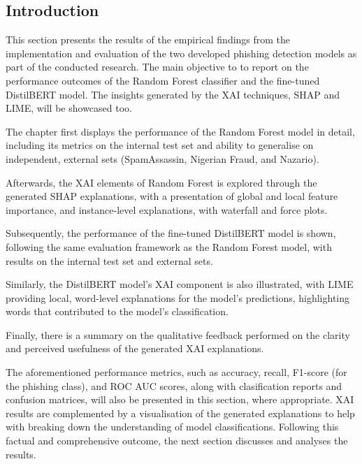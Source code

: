 
\subsection{Introduction}
This section presents the results of the empirical findings from the implementation and evaluation of the two developed phishing detection models as part of the conducted research. The main objective to to report on the performance outcomes of the Random Forest classifier and the fine-tuned DistilBERT model. The insights generated by the XAI techniques, SHAP and LIME, will be showcased too.\newline

\noindent The chapter first displays the performance of the Random Forest model in detail, including its metrics on the internal test set and ability to generalise on independent, external sets (SpamAssassin, Nigerian Fraud, and Nazario).\newline

\noindent Afterwards, the XAI elements of Random Forest is explored through the generated SHAP explanations, with a presentation of global and local feature importance, and instance-level explanations, with waterfall and force plots.\newline

\noindent Subsequently, the performance of the fine-tuned DistilBERT model is shown, following the same evaluation framework as the Random Forest model, with results on the internal test set and external sets.\newline

\noindent Similarly, the DistilBERT model's XAI component is also illustrated, with LIME providing local, word-level explanations for the model's predictions, highlighting words that contributed to the model's classification.\newline

\noindent Finally, there is a summary on the qualitative feedback performed on the clarity and perceived usefulness of the generated XAI explanations.\newline

\noindent The aforementioned performance metrics, such as accuracy, recall, F1-score (for the phishing class), and ROC AUC scores, along with clasification reports and confusion matrices, will also be presented in this section, where appropriate. XAI results are complemented by a visualisation of the generated explanations to help with breaking down the understanding of model classifications. Following this factual and comprehensive outcome, the next section discusses and analyses the results.
